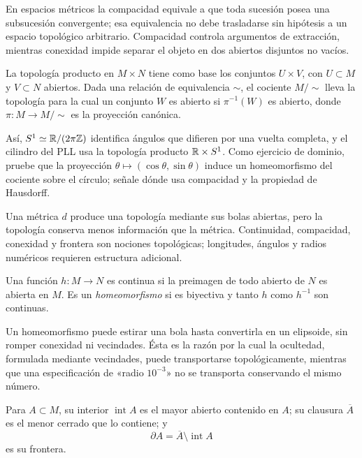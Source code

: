 En espacios métricos la compacidad equivale a que toda sucesión posea una
subsucesión convergente; esa equivalencia no debe trasladarse sin hipótesis a
un espacio topológico arbitrario. Compacidad controla argumentos de
extracción, mientras conexidad impide separar el objeto en dos abiertos
disjuntos no vacíos.

\begin{definition}
La topología producto en \(M\times N\) tiene como base los conjuntos
\(U\times V\), con \(U\subset M\) y \(V\subset N\) abiertos. Dada una relación
de equivalencia \(\sim\), el cociente \(M/{\sim}\) lleva la topología para la
cual un conjunto \(W\) es abierto si \(\pi^{-1}(W)\) es abierto, donde
\(\pi:M\to M/{\sim}\) es la proyección canónica.
\end{definition}

Así, \(S^1\simeq\mathbb{R}/(2\pi\mathbb Z)\) identifica ángulos que difieren por una
vuelta completa, y el cilindro del PLL usa la topología producto
\(\mathbb{R}\times S^1\).
\ifHAFOPedagogy
Como ejercicio de dominio, pruebe que la proyección
\(\theta\mapsto(\cos\theta,\sin\theta)\) induce un homeomorfismo del cociente
sobre el círculo; señale dónde usa compacidad y la propiedad de Hausdorff.
\fi

Una métrica \(d\) produce una topología mediante sus bolas abiertas, pero la
topología conserva menos información que la métrica. Continuidad, compacidad,
conexidad y frontera son nociones topológicas; longitudes, ángulos y radios
numéricos requieren estructura adicional.

\begin{definition}
Una función \(h:M\to N\) es continua si la preimagen de todo abierto de \(N\)
es abierta en \(M\). Es un \emph{homeomorfismo} si es biyectiva y tanto \(h\)
como \(h^{-1}\) son continuas.
\end{definition}

Un homeomorfismo puede estirar una bola hasta convertirla en un elipsoide, sin
romper conexidad ni vecindades. Ésta es la razón por la cual la ocultedad,
formulada mediante vecindades, puede transportarse topológicamente, mientras
que una especificación de «radio \(10^{-3}\)» no se transporta conservando el mismo
número.

\begin{definition}
Para \(A\subset M\), su interior \(\operatorname{int}A\) es el mayor abierto
contenido en \(A\); su clausura \(\overline A\) es el menor cerrado que lo
contiene; y
\begin{equation}
  \partial A=\overline A\setminus\operatorname{int}A
  \label{geo:eq:boundary}
\end{equation}
es su frontera.
\end{definition}


